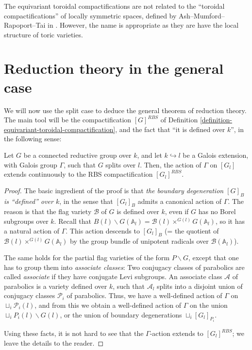 \begin{remark}
 \label{remark-toroidal-name}
The equivariant toroidal compactifications are not related to the ``toroidal compactifications'' of locally symmetric spaces, defined by Ash--Mumford--Rapoport--Tai in \cite{Ash-Mumford-Rapoport-Tai}. However, the name is appropriate as they are have the local structure of toric varieties. 
\end{remark}






\section{Reduction theory in the general case}
\label{section-reduction-theory-general}

We will now use the split case to deduce the general theorem of reduction theory. The main tool will be the compactification $[G]^{RBS}$ of Definition \ref{definition-equivariant-toroidal-compactification}, and the fact that ``it is defined over $k$'', in the following sense:

\begin{proposition}
 \label{proposition-RBS-Galois-stable}
 Let $G$ be a connected reductive group over $k$, and let $k\hookrightarrow l$ be a Galois extension, with Galois group $\Gamma$, such that $G$ splits over $l$. Then, the action of $\Gamma$ on $[G_l]$ extends continuously to the RBS compactification $[G_l]^{RBS}$.
\end{proposition}

\begin{proof}
 The basic ingredient of the proof is that \emph{the boundary degeneration $[G]_B$ is ``defined'' over $k$}, in the sense that $[G_l]_B$ admits a canonical action of $\Gamma$. The reason is that the flag variety $\mathcal B$ of $G$ is defined over $k$, even if $G$ has no Borel subgroups over $k$. Recall that $B(l)\backslash G(\mathbb A_l) = \mathcal B(l)\times^{G(l)}G(\mathbb A_l)$, so it has a natural action of $\Gamma$. This action descends to $[G_l]_B$ (= the quotient of $\mathcal B(l)\times^{G(l)}G(\mathbb A_l)$ by the group bundle of unipotent radicals over $\mathcal B(\mathbb A_l)$).
 
 The same holds for the partial flag varieties of the form $P\backslash G$, except that one has to group them into \emph{associate classes}: Two conjugacy classes of parabolics are called \emph{associate} if they have conjugate Levi subgroups. An associate class $\mathcal A$ of parabolics is a variety defined over $k$, such that $\mathcal A_l$ splits into a disjoint union of conjugacy classes $\mathcal P_i$ of parabolics. Thus, we have a well-defined action of $\Gamma$ on $\sqcup_i \mathcal P_i(l)$, and from this we obtain a well-defined action of $\Gamma$ on the union $\sqcup_i P_i(l)\backslash G(l)$, or the union of boundary degenerations $\sqcup_i [G_l]_{P_i}$. 
 
 Using these facts, it is not hard to see that the $\Gamma$-action extends to $[G_l]^{RBS}$; we leave the details to the reader.
\end{proof}



